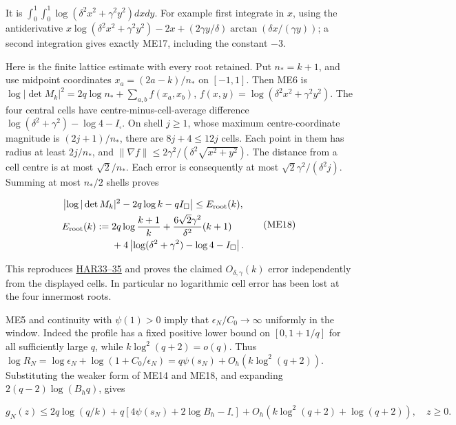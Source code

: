 \documentclass[11pt]{article}
\begin{document}
It is \(\int_0^1\int_0^1\log(\delta^2x^2+\gamma^2y^2)dxdy\). For example first integrate in \(x\), using the antiderivative \(x\log(\delta^2x^2+\gamma^2y^2)-2x+(2\gamma y/\delta)\arctan(\delta x/(\gamma y))\); a second integration gives exactly ME17, including the constant \(-3\).

Here is the finite lattice estimate with every root retained. Put \(n_*=k+1\), and use midpoint coordinates \(x_a=(2a-k)/n_*\) on \([-1,1]\). Then ME6 is \(\log|\det M_k|^2=2q\log n_*+\sum_{a,b}f(x_a,x_b)\), \(f(x,y)=\log(\delta^2x^2+\gamma^2y^2)\). The four central cells have centre-minus-cell-average difference \(\log(\delta^2+\gamma^2)-\log4-I_\square\). On shell \(j\ge1\), whose maximum centre-coordinate magnitude is \((2j+1)/n_*\), there are \(8j+4\le12j\) cells. Each point in them has radius at least \(2j/n_*\), and \(\|\nabla f\|\le2\gamma^2/(\delta^2\sqrt{x^2+y^2})\). The distance from a cell centre is at most \(\sqrt2/n_*\). Each error is consequently at most \(\sqrt2\gamma^2/(\delta^2j)\). Summing at most \(n_*/2\) shells proves

\[
\begin{gathered}
\left|\log|\det M_k|^2-2q\log k-qI_\square\right|\le E_{\rm root}(k),\\
\begin{aligned}
E_{\rm root}(k):={}&2q\log\frac{k+1}{k}+\frac{6\sqrt2\gamma^2}{\delta^2}(k+1)\\
&+4\left|\log(\delta^2+\gamma^2)-\log4-I_\square\right|.
\end{aligned}
\end{gathered}
\tag{ME18}
\]

This reproduces \href{https://github.com/KokunoYumeto/zeta-function-research-reader/blob/360d3c1d798da434966d35f7e407fc59c14f234b/workbenches/splitzero-tandem/continuations/20260921-critical-inverse-activation/HARMONIC_PROOFS.md\#L357}{HAR33--35} and proves the claimed \(O_{\delta,\gamma}(k)\) error independently from the displayed cells. In particular no logarithmic cell error has been lost at the four innermost roots.

ME5 and continuity with \(\psi(1)>0\) imply that \(\epsilon_N/C_0\to\infty\) uniformly in the window. Indeed the profile has a fixed positive lower bound on \([0,1+1/q]\) for all sufficiently large \(q\), while \(k\log^2(q+2)=o(q)\). Thus \(\log R_N=\log\epsilon_N+\log(1+C_0/\epsilon_N)=q\psi(s_N)+O_h(k\log^2(q+2))\). Substituting the weaker form of ME14 and ME18, and expanding \(2(q-2)\log(B_hq)\), gives

\[
\boxed{g_N(z)\le2q\log(q/k)
 +q[4\psi(s_N)+2\log B_h-I_\square]
 +O_h(k\log^2(q+2)+\log(q+2)),\quad z\ge0.}
\tag{ME19}
\]
\end{document}
